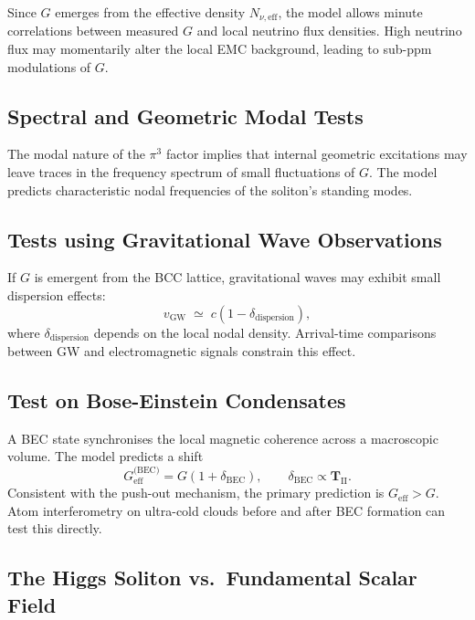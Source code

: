 \documentclass[10pt,a4paper]{article}
\begin{document}
Since \(G\) emerges from the effective density \(N_{\nu,\text{eff}}\), the model allows minute correlations between measured \(G\) and local neutrino flux densities. High neutrino flux may momentarily alter the local EMC background, leading to sub-ppm modulations of \(G\).

\subsection{Spectral and Geometric Modal Tests}
\label{sec:modal_tests_pp}

The modal nature of the \(\pi^3\) factor implies that internal geometric excitations may leave traces in the frequency spectrum of small fluctuations of \(G\). The model predicts characteristic nodal frequencies of the soliton's standing modes.

\subsection{Tests using Gravitational Wave Observations}
\label{sec:LIGO_test_pp}

If \(G\) is emergent from the BCC lattice, gravitational waves may exhibit small dispersion effects:
\begin{equation}
	v_{\text{GW}}
	\;\simeq\;
	c \left( 1 - \delta_{\text{dispersion}} \right),
\end{equation}
where \(\delta_{\text{dispersion}}\) depends on the local nodal density. Arrival-time comparisons between GW and electromagnetic signals constrain this effect.

\subsection{Test on Bose-Einstein Condensates}
\label{sec:BEC_test}

A BEC state synchronises the local magnetic coherence across a macroscopic volume. The model predicts a shift
\begin{equation}
	G_{\text{eff}}^{\text{(BEC)}}
	=
	G \left( 1 + \delta_{\text{BEC}} \right),
	\qquad
	\delta_{\text{BEC}} \propto \mathbf{T}_{\text{II}}.
\end{equation}
Consistent with the push-out mechanism, the primary prediction is \(G_{\text{eff}} > G\). Atom interferometry on ultra-cold clouds before and after BEC formation can test this directly.

\subsection{The Higgs Soliton vs.\ Fundamental Scalar Field}
\end{document}
